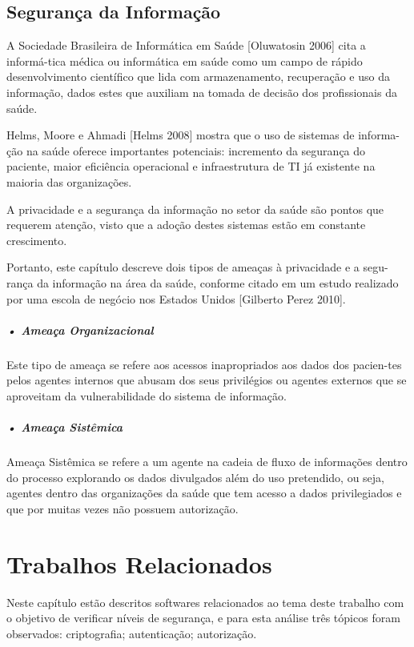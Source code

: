 \documentclass[portuguese,oneside]{tcc}
\begin{document}
\section{Segurança da Informação}
A Sociedade Brasileira de Informática em Saúde [Oluwatosin 2006] cita a informá-tica médica ou informática em saúde como um campo de rápido desenvolvimento científico que lida com armazenamento, recuperação e uso da informação, dados estes que auxiliam na tomada de decisão dos profissionais da saúde.

Helms, Moore e Ahmadi [Helms 2008] mostra que o uso de sistemas de informa-ção na saúde oferece importantes potenciais: incremento da segurança do paciente, maior eficiência operacional e infraestrutura de TI já existente na maioria das organizações.

A privacidade e a segurança da informação no setor da saúde são pontos que requerem atenção, visto que a adoção destes sistemas estão em constante crescimento.

Portanto, este capítulo descreve dois tipos de ameaças à privacidade e a segu-rança da informação na área da saúde, conforme citado em um estudo realizado por uma escola de negócio nos Estados Unidos [Gilberto Perez 2010].


\paragraph*{• Ameaça Organizacional}
Este tipo de ameaça se refere aos acessos inapropriados aos dados dos pacien-tes pelos agentes internos que abusam dos seus privilégios ou agentes externos que se aproveitam da vulnerabilidade do sistema de informação.


\paragraph*{• Ameaça Sistêmica}
Ameaça Sistêmica se refere a um agente na cadeia de fluxo de informações dentro do processo explorando os dados divulgados além do uso pretendido, ou seja, agentes dentro das organizações da saúde que tem acesso a dados privilegiados e que por muitas vezes não possuem autorização.

\chapter{Trabalhos Relacionados}
\label{tab:trabalhos-relacionados}	
Neste capítulo estão descritos softwares relacionados ao tema deste trabalho com o objetivo de verificar níveis de segurança, e para esta análise três tópicos foram observados: criptografia; autenticação; autorização.
\end{document}
